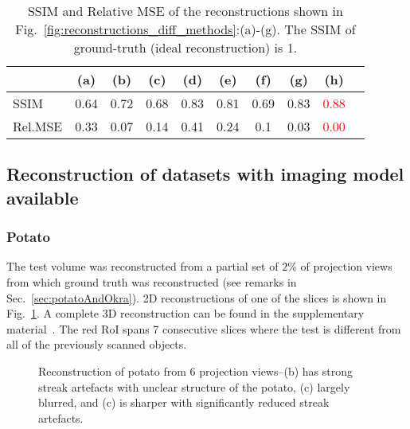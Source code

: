 \documentclass[journal]{IEEEtran}
\begin{document}
\begin{table}[!h]
  \centering
\caption{SSIM and Relative MSE of the reconstructions shown in Fig.~\ref{fig:reconstructions_diff_methods}:(a)-(g). The SSIM of ground-truth (ideal reconstruction) is 1.}
\begin{tabular}{|l|c|c|c|c|c|c|c|c|c|}
\hline
 & \textbf{(a)} & \textbf{(b)} & \textbf{(c)} & \textbf{(d)} & \textbf{(e)} & \textbf{(f)} &  \textbf{(g)} &  \textbf{(h)} \\\hline
SSIM & 0.64 & 0.72  & 0.68 & 0.83 & 0.81 & 0.69 & 0.83 &\textcolor{red}{0.88} \\ \hline
Rel.MSE & 0.33 & 0.07 & 0.14 & 0.41 & 0.24 & 0.1 & 0.03 & \textcolor{red}{0.00}\\ \hline
\end{tabular}
\label{table:potato_2D_ssim}
\end{table}

\subsection{Reconstruction of datasets with imaging model available}
\subsubsection{\textbf{Potato}}
\label{Sec:potato_spatially_varying}

The test volume was reconstructed from a partial set of $2\%$ of projection views from
which ground truth was reconstructed (see remarks in
Sec.~\ref{sec:potatoAndOkra}). 2D reconstructions of one of the slices
is shown in Fig.~\ref{fig:potato_2D_results}. A complete 3D
reconstruction can be found in the supplementary
material~\cite{supp_paper}. The red RoI spans 7 consecutive slices
where the test is different from all of the previously scanned
objects. %
\begin{figure}[!h]
\centering
{}
\caption{Reconstruction of potato from 6 projection views--(b) has strong streak artefacts with unclear structure of the potato, (c) largely blurred, and (c) is sharper with significantly reduced streak artefacts.}
\label{fig:potato_2D_results}
\end{figure}
\end{document}
